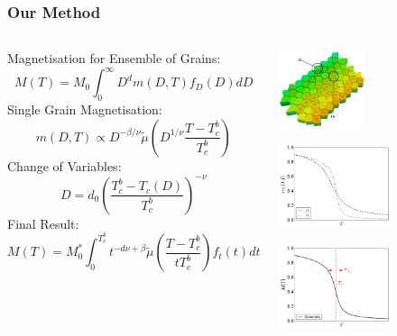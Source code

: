 \documentclass{beamer}
\begin{document}
\begin{frame}
	\frametitle{Our Method}
	\begin{columns}
	\column{8cm}
	\small{
	\newline
	Magnetisation for Ensemble of Grains:
	$$
	M(T) = M_0\int_0^\infty D^{d} m(D,T) f_D(D) dD
	$$
	Single Grain Magnetisation:
	$$
	m(D,T) \propto D^{-\beta/\nu} \tilde{\mu} \left(D^{1/\nu}\frac{T-T_c^b}{T_c^b}\right)
	$$
	Change of Variables:
	$$
	D = d_0\left(\frac{T_c^b - T_c(D)}{T_c^b}\right)^{-\nu}
	$$
	Final Result:
	$$
	M(T) = M_0^*\int_0^{T_c^b} t^{-d\nu +\beta} \tilde{\mu}\left(\frac{T-T_c^b}{tT_c^b}\right) f_t(t) dt
	$$}
	\column{4cm}
	\begin{center}
	\includegraphics[width=2.5cm]{Images/grains2}

	\includegraphics[width=3.25cm]{Images/Ds_noinset}

	\includegraphics[width=3.25cm]{Images/Aggregate}
	\end{center}
	\end{columns}
\end{frame}
\end{document}
